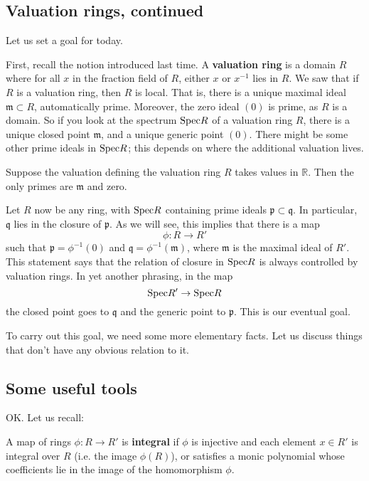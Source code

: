 \subsection{Valuation rings, continued}
Let us set a goal for today.


First, recall the notion introduced last time. A \textbf{valuation ring} is a
domain $R$ where for all $x$ in the fraction field of $R$, either $x$ or
$x^{-1}$ lies in $R$. We saw that if $R$ is a valuation ring, then $R$ is
local. That is, there is a unique maximal ideal $\mathfrak{m} \subset R$,
automatically prime.  Moreover, the zero ideal $(0)$ is prime, as $R$ is a
domain. So if you look at the spectrum $\mathrm{Spec} R$ of a valuation ring $R$, there
is a unique closed point $\mathfrak{m}$, and a unique generic point
$(0)$.  There might be some other prime ideals in $\mathrm{Spec} R$; this depends on
where the additional valuation lives.

\begin{example} 
Suppose the valuation defining the valuation ring $R$ takes values in
$\mathbb{R}$. Then the only primes are $\mathfrak{m}$ and zero.
\end{example} 

Let $R$ now be any ring, with $\mathrm{Spec} R$ containing prime ideals
$\mathfrak{p} \subset \mathfrak{q}$.  In particular, $\mathfrak{q}$ lies in
the closure of $\mathfrak{p}$. 
As we will see, this implies that there is a map
\[  \phi: R \to R'  \]
such that $\mathfrak{p} = \phi^{-1}(0)$ and $\mathfrak{q} =
\phi^{-1}(\mathfrak{m})$, where $\mathfrak{m}$ is the maximal ideal of $R'$.
This statement says that the relation of closure in $\mathrm{Spec} R$ is always
controlled by valuation rings.  
In yet another phrasing, in the map
\[ \mathrm{Spec} R' \to \mathrm{Spec} R  \]
the closed point goes to $\mathfrak{q}$ and the generic point to
$\mathfrak{p}$. This is our eventual goal.

To carry out this goal, we need some more elementary facts. Let us discuss
things that don't have any obvious relation to it.

\subsection{Some useful tools}

OK. Let us recall:

\begin{definition} 
A map of rings $\phi: R \to R'$ is \textbf{integral} if $\phi$ is injective and
each element $x \in R'$ is integral over $R$ (i.e. the image $\phi(R)$), or
satisfies a monic polynomial whose coefficients lie in the image of the
homomorphism $\phi$.
\end{definition} 


